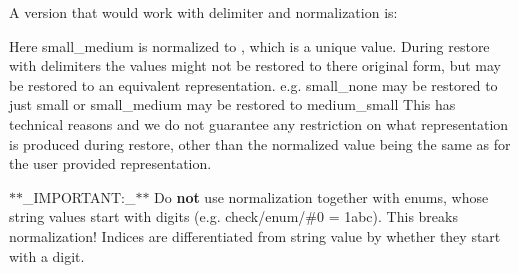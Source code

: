 A version that would work with delimiter and normalization is\+:


\begin{DoxyCode}{0}
\end{DoxyCode}


Here {\ttfamily small\+\_\+medium} is normalized to {}, which is a unique value. During restore with delimiters the values might not be restored to there original form, but may be restored to an equivalent representation. e.\+g. {\ttfamily small\+\_\+none} may be restored to just {\ttfamily small} or {\ttfamily small\+\_\+medium} may be restored to {\ttfamily medium\+\_\+small} This has technical reasons and we do not guarantee any restriction on what representation is produced during restore, other than the normalized value being the same as for the user provided representation.

$\ast$$\ast$\+\_\+\+I\+M\+P\+O\+R\+T\+A\+NT\+:\+\_\+$\ast$$\ast$ Do {\bfseries{not}} use normalization together with enums, whose string values start with digits (e.\+g. {\ttfamily check/enum/\#0 = 1abc}). This breaks normalization! Indices are differentiated from string value by whether they start with a digit.


\begin{DoxyCode}{0}
\DoxyCodeLine{}
\DoxyCodeLine{}
\DoxyCodeLine{}
\DoxyCodeLine{}
\DoxyCodeLine{}
\end{DoxyCode}


